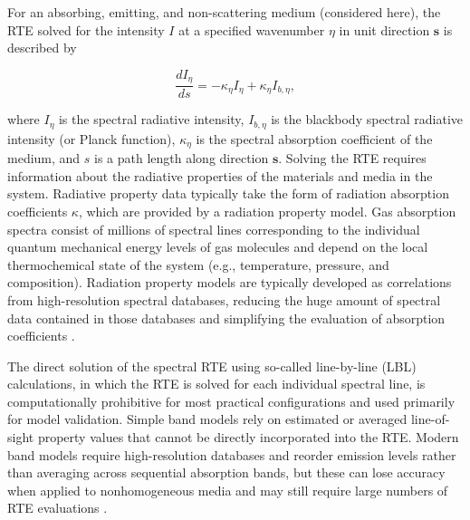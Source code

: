 \documentclass[preprint,12pt]{elsarticle}
\newcounter{bla}
\begin{document}
For an absorbing, emitting, and non-scattering medium (considered here), the RTE solved for the intensity $I$ at a specified wavenumber $\eta$ in unit direction $\mathbf{s}$ is described by
%
\begin{linenomath}
\begin{equation} \label{e:RTE_general}
    \frac{dI_{\eta}}{ds} = -\kappa_{\eta}I_{\eta} + \kappa_{\eta}I_{b,\eta},
\end{equation}
\end{linenomath}
%
where $I_{\eta}$ is the spectral radiative intensity, $I_{b,\eta}$ is the blackbody spectral radiative intensity (or Planck function), $\kappa_{\eta}$ is the spectral absorption coefficient of the medium, and $s$ is a path length along direction $\mathbf{s}$.
Solving the RTE requires information about the radiative properties of the materials and media in the system. Radiative property data typically take the form of radiation absorption coefficients $\kappa$, which are provided by a radiation property model. Gas absorption spectra consist of millions of spectral lines corresponding to the individual quantum mechanical energy levels of gas molecules and depend on the local thermochemical state of the system (e.g., temperature, pressure, and composition).
Radiation property models are typically developed as correlations from high-resolution spectral databases, reducing the huge amount of spectral data contained in those databases and simplifying the evaluation of absorption coefficients \cite{Zhang_2002b}.

The direct solution of the spectral RTE using so-called line-by-line (LBL) calculations, in which the RTE is solved for each individual spectral line, is computationally prohibitive for most practical configurations and used primarily for model validation.
Simple band models rely on estimated or averaged line-of-sight property values that cannot be directly incorporated into the RTE.
Modern band models require high-resolution databases and reorder emission levels rather than averaging across sequential absorption bands, but these can lose accuracy when applied to nonhomogeneous media and may still require large numbers of RTE evaluations \citep{Modest_2016}.
\end{document}
